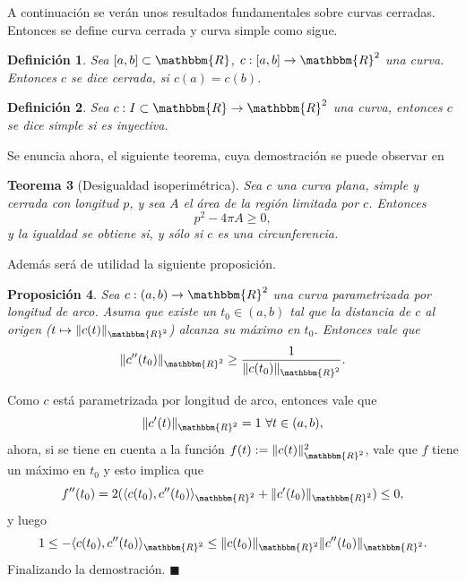 \documentclass[a4paper,10pt]{book}
\newcommand{\R}{\mathbbm{R}}
\newcommand{\arr}{\rightarrow}
\newcommand{\la}{\langle}
\newcommand{\ra}{\rangle}
\newtheorem{teo}{Teorema}%
\newtheorem{prop}[teo]{Proposici\'on}
\newtheorem{defi}[teo]{Definici\'on}
\newenvironment{dem}{\vspace*{-0.1cm}{\it Demostraci\'on:}}{\hfill
$\blacksquare$\\}
\begin{document}
A continuación se verán unos resultados fundamentales sobre curvas cerradas. Entonces se define curva cerrada y curva simple como sigue.

\begin{defi}
 Sea $[a,b]\subset\R$, $c:[a,b]\arr\R^2$ una curva. Entonces $c$ se dice cerrada, si $c(a)=c(b)$. 
\end{defi}

\begin{defi}\label{curvasimple}
Sea $c:I\subset\R\arr\R^2$ una curva, entonces $c$ se dice simple si es inyectiva.
\end{defi}

Se enuncia ahora, el siguiente teorema, cuya demostración se puede observar en \cite[Theorem 1, pg 33-35]{do1990geometria}

\begin{teo}[Desigualdad isoperimétrica]\label{desigualdadisoperimetrica}
Sea $c$ una curva plana, simple y cerrada con longitud $p$, y sea $A$ el área de la región limitada por $c$. Entonces
\begin{equation*}
    p^2-4\pi A\geq0,
\end{equation*}
y la igualdad se obtiene si, y sólo si $c$ es una circunferencia.
\end{teo}

Además será de utilidad la siguiente proposición.

\begin{prop}\label{cotainfcurvatura}
 Sea $c:(a,b)\arr\R^2$ una curva parametrizada por longitud de arco. Asuma que existe un $t_0\in(a,b)$ tal que la distancia de $c$ al origen ($t\mapsto\|c(t)\|_{\R^2}$) alcanza su máximo en $t_0$. Entonces vale que 
 $$\|c''(t_0)\|_{\R^2}\geq\frac{1}{\|c(t_0)\|_{\R^2}}.$$
\end{prop}

\begin{dem}
Como $c$ está parametrizada por longitud de arco, entonces vale que $$\|c'(t)\|_{\R^2}=1\ \forall t\in(a,b),$$
ahora, si se tiene en cuenta a la función $f(t):=\|c(t)\|^2_{\R^2}$, vale que $f$ tiene un máximo en $t_0$ y esto implica que $$f''(t_0)=2(\la c(t_0),c''(t_0)\ra_{\R^2}+\|c'(t_0)\|_{\R^2})\leq 0,$$
y luego $$1\leq-\la c(t_0),c''(t_0)\ra_{\R^2}\leq\|c(t_0)\|_{\R^2}\|c''(t_0)\|_{\R^2}.$$
Finalizando la demostración.
\end{dem}

\end{document}
